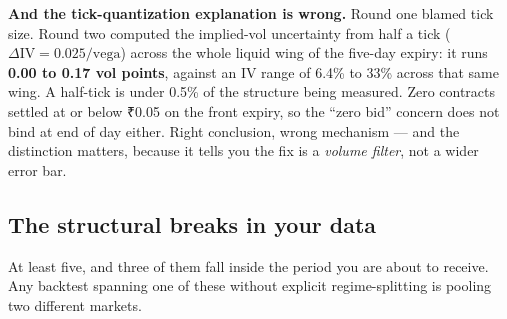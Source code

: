 \documentclass[11pt,a4paper]{article}
\newcommand{\rs}{₹}
\begin{document}
\textbf{And the tick-quantization explanation is wrong.} Round one blamed tick
size. Round two computed the implied-vol uncertainty from half a tick
($\Delta\text{IV} = 0.025/\text{vega}$) across the whole liquid wing of the
five-day expiry: it runs \textbf{0.00 to 0.17 vol points}, against an IV range of
6.4\% to 33\% across that same wing. A half-tick is under 0.5\% of the structure
being measured. Zero contracts settled at or below \rs 0.05 on the front expiry,
so the ``zero bid'' concern does not bind at end of day either. Right conclusion,
wrong mechanism --- and the distinction matters, because it tells you the fix is
a \emph{volume filter}, not a wider error bar.

\subsection{The structural breaks in your data}
\label{sec:breaks}

At least five, and three of them fall inside the period you are about to receive.
Any backtest spanning one of these without explicit regime-splitting is pooling
two different markets.
\end{document}
